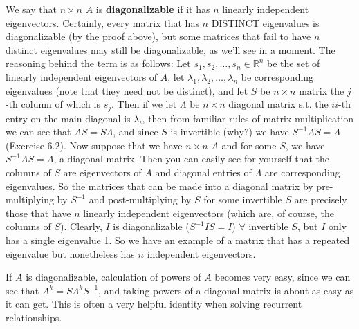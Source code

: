 \documentclass[12pt,oneside]{article}
\begin{document}
We say that $n \times n$ $A$ is \textbf{diagonalizable} if it has $n$
linearly independent eigenvectors. Certainly, every matrix that has
$n$ DISTINCT eigenvalues is diagonalizable (by the proof above), but
some matrices that fail to have $n$ distinct eigenvalues may still be
diagonalizable, as we'll see in a moment. The reasoning behind the
term is as follows: Let $s_1, s_2, \ldots, s_n \in {\mathbb{R}}^n$ be
the set of linearly independent eigenvectors of $A$, let $\lambda_1,
\lambda_2, \ldots, \lambda_n$ be corresponding eigenvalues (note that
they need not be distinct), and let $S$ be $n \times n$ matrix the $j$-th
column of which is $s_j$. Then if we let $\Lambda$ be $n \times n$
diagonal matrix s.t. the $ii$-th entry on the main diagonal is
$\lambda_i$, then from familiar rules of matrix multiplication we
can see that $AS = S \Lambda$, and since $S$ is invertible (why?) we
have $S^{-1} A S = \Lambda$ (Exercise 6.2). Now suppose that we have $n \times n$ $A$
and for some $S$, we have $S^{-1} A S = \Lambda$, a diagonal
matrix. Then you can easily see for yourself that the columns of $S$
are eigenvectors of $A$ and diagonal entries of $\Lambda$ are
corresponding eigenvalues. So the matrices that can be made into a
diagonal matrix by pre-multiplying by $S^{-1}$ and post-multiplying by
$S$ for some invertible $S$ are precisely those that have $n$ linearly
independent eigenvectors (which are, of course, the columns of
$S$). Clearly, $I$ is diagonalizable ($S^{-1} I S = I$) $\forall$
invertible $S$, but $I$ only has a single eigenvalue 1. So we have an
example of a matrix that has a repeated eigenvalue but nonetheless has
$n$ independent eigenvectors.

If $A$ is diagonalizable, calculation of powers of $A$ becomes very
easy, since we can see that $A^k = S \Lambda^k S^{-1}$, and taking
powers of a diagonal matrix is about as easy as it can get. This is often
a very helpful identity when solving recurrent relationships.
\\
\end{document}
